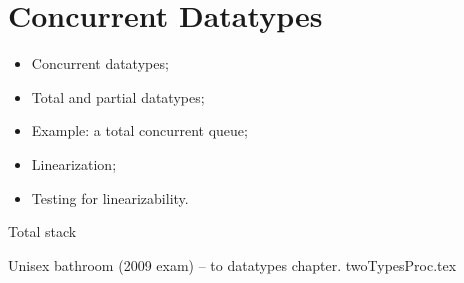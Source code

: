 \chapter{Concurrent Datatypes}
\label{chap:datatypes}




\begin{slide}

\begin{itemize}
\item 
Concurrent datatypes;

\item
Total and partial datatypes;

\item Example: a total concurrent queue;

\item
Linearization; 

\item Testing for linearizability.
\end{itemize}
\end{slide}


\exercises

Total stack

Unisex bathroom (2009 exam) -- to datatypes chapter.  twoTypesProc.tex
